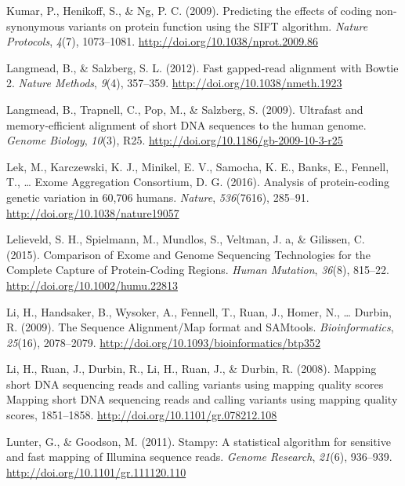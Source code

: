 \documentclass[12pt,twoside]{reedthesis}
\theoremstyle{definition}
\theoremstyle{definition}
\theoremstyle{remark}
\begin{document}
  \hypertarget{ref-Kumar2009}{}
  Kumar, P., Henikoff, S., \& Ng, P. C. (2009). Predicting the effects of
  coding non-synonymous variants on protein function using the SIFT
  algorithm. \emph{Nature Protocols}, \emph{4}(7), 1073--1081.
  \url{http://doi.org/10.1038/nprot.2009.86}
  
  \hypertarget{ref-Langmead2012}{}
  Langmead, B., \& Salzberg, S. L. (2012). Fast gapped-read alignment with
  Bowtie 2. \emph{Nature Methods}, \emph{9}(4), 357--359.
  \url{http://doi.org/10.1038/nmeth.1923}
  
  \hypertarget{ref-Langmead2009}{}
  Langmead, B., Trapnell, C., Pop, M., \& Salzberg, S. (2009). Ultrafast
  and memory-efficient alignment of short DNA sequences to the human
  genome. \emph{Genome Biology}, \emph{10}(3), R25.
  \url{http://doi.org/10.1186/gb-2009-10-3-r25}
  
  \hypertarget{ref-Lek2016}{}
  Lek, M., Karczewski, K. J., Minikel, E. V., Samocha, K. E., Banks, E.,
  Fennell, T., \ldots{} Exome Aggregation Consortium, D. G. (2016).
  Analysis of protein-coding genetic variation in 60,706 humans.
  \emph{Nature}, \emph{536}(7616), 285--91.
  \url{http://doi.org/10.1038/nature19057}
  
  \hypertarget{ref-Lelieveld2015}{}
  Lelieveld, S. H., Spielmann, M., Mundlos, S., Veltman, J. a, \&
  Gilissen, C. (2015). Comparison of Exome and Genome Sequencing
  Technologies for the Complete Capture of Protein-Coding Regions.
  \emph{Human Mutation}, \emph{36}(8), 815--22.
  \url{http://doi.org/10.1002/humu.22813}
  
  \hypertarget{ref-Li2009}{}
  Li, H., Handsaker, B., Wysoker, A., Fennell, T., Ruan, J., Homer, N.,
  \ldots{} Durbin, R. (2009). The Sequence Alignment/Map format and
  SAMtools. \emph{Bioinformatics}, \emph{25}(16), 2078--2079.
  \url{http://doi.org/10.1093/bioinformatics/btp352}
  
  \hypertarget{ref-Li2008}{}
  Li, H., Ruan, J., Durbin, R., Li, H., Ruan, J., \& Durbin, R. (2008).
  Mapping short DNA sequencing reads and calling variants using mapping
  quality scores Mapping short DNA sequencing reads and calling variants
  using mapping quality scores, 1851--1858.
  \url{http://doi.org/10.1101/gr.078212.108}
  
  \hypertarget{ref-Lunter2011}{}
  Lunter, G., \& Goodson, M. (2011). Stampy: A statistical algorithm for
  sensitive and fast mapping of Illumina sequence reads. \emph{Genome
  Research}, \emph{21}(6), 936--939.
  \url{http://doi.org/10.1101/gr.111120.110}
  
\end{document}
